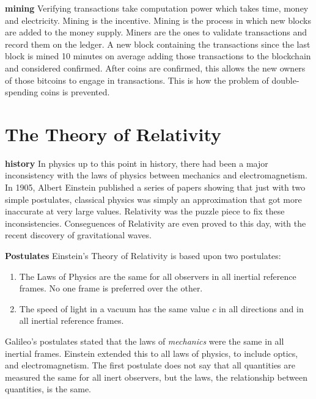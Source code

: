 \documentclass[conference]{IEEEtran}
\begin{document}
\textbf{mining} Verifying transactions take computation power which takes time, money and electricity. Mining is the incentive. Mining is the process in which new blocks are added to the money supply. Miners are the ones to validate transactions and record them on the ledger. A new block containing the transactions since the last block is mined 10 minutes on average adding those transactions to the blockchain and considered confirmed. After coins are confirmed, this allows the new owners of those bitcoins to engage in transactions. This is how the problem of double-spending coins is prevented. 

\section{The Theory of Relativity}
\textbf{history} In physics up to this point in history, there had been a major inconsistency with the laws of physics between mechanics and electromagnetism. In 1905, Albert Einstein published a series of papers showing that just with two simple postulates, classical physics was simply an approximation that got more inaccurate at very large values. Relativity was the puzzle piece to fix these inconsistencies. Conseguences of Relativity are even proved to this day, with the recent discovery of gravitational waves. 

\textbf{Postulates} Einstein's Theory of Relativity is based upon two postulates: 
\begin{enumerate}
\item The Laws of Physics are the same for all observers in all inertial reference frames. No one frame is preferred over the other.
\item The speed of light in a vacuum has the same value $c$ in all directions and in all inertial reference frames.
\end{enumerate} 

Galileo's postulates stated that the laws of \textit{mechanics} were the same in all inertial frames. Einstein extended this to all laws of physics, to include optics, and electromagnetism. The first postulate does not say that all quantities are measured the same for all inert observers, but the laws, the relationship between quantities, is the same. 
\end{document}
